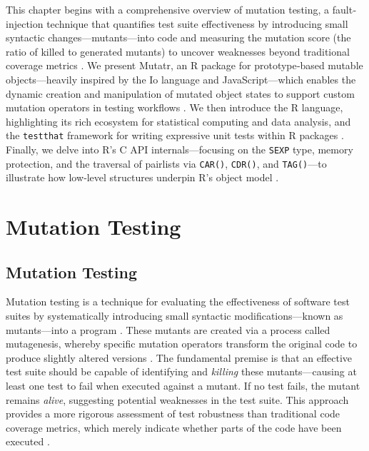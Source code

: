 
\begin{chapterabstract}
This chapter begins with a comprehensive overview of mutation testing, a fault‐injection technique that quantifies test suite effectiveness by introducing small syntactic changes—mutants—into code and measuring the mutation score (the ratio of killed to generated mutants) to uncover weaknesses beyond traditional coverage metrics \cite{jia2011analysis,offutt1996practical,petrovic2018industrial}. We present Mutatr, an R package for prototype‐based mutable objects—heavily inspired by the Io language and JavaScript—which enables the dynamic creation and manipulation of mutated object states to support custom mutation operators in testing workflows \cite{wickham_mutatr,iolanguage}. We then introduce the R language, highlighting its rich ecosystem for statistical computing and data analysis, and the \texttt{testthat} framework for writing expressive unit tests within R packages \cite{R-base,wickham2011testthat}. Finally, we delve into R’s C API internals—focusing on the \texttt{SEXP} type, memory protection, and the traversal of pairlists via \texttt{CAR()}, \texttt{CDR()}, and \texttt{TAG()}—to illustrate how low‐level structures underpin R’s object model \cite{wickham_pairlists}.  

\end{chapterabstract}

\section{Mutation Testing}

\subsection{Mutation Testing}

Mutation testing is a technique for evaluating the effectiveness of software test suites by systematically introducing small syntactic modifications—known as mutants—into a program \cite{jia2011analysis}. These mutants are created via a process called mutagenesis, whereby specific mutation operators transform the original code to produce slightly altered versions \cite{offutt1996practical}. The fundamental premise is that an effective test suite should be capable of identifying and \textit{killing} these mutants—causing at least one test to fail when executed against a mutant. If no test fails, the mutant remains \textit{alive}, suggesting potential weaknesses in the test suite. This approach provides a more rigorous assessment of test robustness than traditional code coverage metrics, which merely indicate whether parts of the code have been executed \cite{petrovic2018industrial}.

